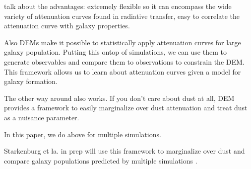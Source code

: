 talk about the advantages: extremely flexible so it can encompass the wide variety of
attenuation curves found in radiative transfer, easy to correlate the
attenuation curve with galaxy properties. 

Also DEMs make it possible to statistically apply attenuation curves for large
galaxy population. Putting this ontop of simulations, we can use them to
generate observables and compare them to observations to constrain the DEM. 
This framework allows us to learn about attenuation curves given a model for 
galaxy formation. 

The other way around also works. If you don't care about dust at all, DEM
provides a framework to easily marginalize over dust attenuation and treat dust
as a nuisance parameter. 

In this paper, we do above for multiple simulations. 

Starkenburg et la. in prep will use this framework to marginalize over dust and compare galaxy populations predicted by multiple
simulations . 

